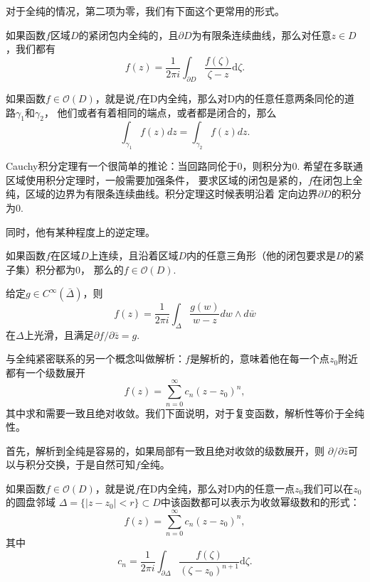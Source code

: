 对于全纯的情况，第二项为零，我们有下面这个更常用的形式。

\begin{thm}[Cauchy积分公式]
    如果函数$f$区域$D$的紧闭包内全纯的，且$\partial D$为有限条连续曲线，那么对任意$z\in D$，我们都有
	\[
		f(z)=\frac{1}{2\pi i}\int_{\partial D}\frac{f(\zeta)}{\zeta -z}\mathrm{d}\zeta.
	\]
\end{thm}


\begin{thm}[Cauchy积分定理]
	如果函数$f \in \mathcal{O}(D)$，就是说$f$在D内全纯，那么对D内的任意任意两条同伦的道路$\gamma_1$和$\gamma_2$，
    他们或者有着相同的端点，或者都是闭合的，那么
	\[
		\int_{\gamma_1}f(z)dz=\int_{\gamma_2}f(z)dz.
	\]
\end{thm}
Cauchy积分定理有一个很简单的推论：当回路同伦于0，则积分为0. 希望在多联通区域使用积分定理时，一般需要加强条件，
要求区域的闭包是紧的，$f$在闭包上全纯，区域的边界为有限条连续曲线。积分定理这时候表明沿着
定向边界$\partial D$的积分为0.

同时，他有某种程度上的逆定理。
\begin{thm}[Morera]
	如果函数$f $在区域$D$上连续，且沿着区域$D$内的任意三角形（他的闭包要求是$D$的紧子集）积分都为$0$，
    那么的$f \in \mathcal{O}(D)$.
\end{thm}

\begin{lem}
给定$g\in C^\infty(\bar \Delta)$，则
\[
    f(z)=\frac{1}{2 \pi i} \int_{\Delta} \frac{g(w)}{w-z} d w \wedge d \bar{w}
\]
在$\Delta$上光滑，且满足$\partial f/\partial \bar z=g$.
\end{lem}

与全纯紧密联系的另一个概念叫做解析：$f$是解析的，意味着他在每一个点$z_0$附近都有一个级数展开
\[
    f(z)=\sum_{n=0}^\infty c_n(z-z_0)^n,
\]
其中求和需要一致且绝对收敛。我们下面说明，对于复变函数，解析性等价于全纯性。

首先，解析到全纯是容易的，如果局部有一致且绝对收敛的级数展开，则
$\partial/\partial \bar z$可以与积分交换，于是自然可知$f$全纯。

\begin{pro}
    如果函数$f \in \mathcal{O}(D)$，就是说$f$在D内全纯，那么对D内的任意一点$z_0$我们可以在$z_0$的圆盘邻域
    $\Delta=\{|z-z_0|<r\}\subset D$中该函数都可以表示为收敛幂级数和的形式：
	\[
		f(z)=\sum_{n=0}^\infty c_n(z-z_0)^n,
	\]
    其中
	\[
		c_n=\frac{1}{2\pi i}\int_{\partial \Delta}\frac{f(\zeta)}{(\zeta -z_0)^{n+1}}\mathrm{d}\zeta.
	\]
\end{pro}

